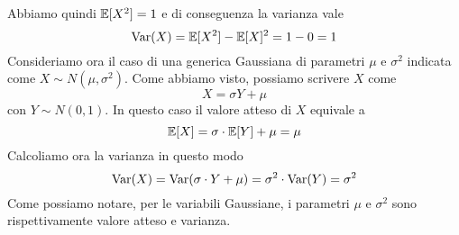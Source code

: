 Abbiamo quindi $\mathbb{E}[X^2] = 1$ e di conseguenza la varianza vale
\[ \operatorname{Var}(X) = \mathbb{E}[X^2] - \mathbb{E}[X]^2 = 1 - 0 = 1 \]
Consideriamo ora il caso di una generica Gaussiana di parametri $\mu$ e $\sigma^2$ indicata come
$X \sim N(\mu, \sigma^2)$. Come abbiamo visto, possiamo scrivere $X$ come
\[ X = \sigma Y + \mu \]
con $Y \sim N(0,1)$. In questo caso il valore atteso di $X$ equivale a
\[ \mathbb{E}[X] = \sigma \cdot \mathbb{E}[Y] + \mu = \mu \]
Calcoliamo ora la varianza in questo modo
\[ \operatorname{Var}(X) = \operatorname{Var}(\sigma \cdot Y + \mu) = \sigma^2 \cdot \operatorname{Var}(Y) = \sigma^2 \]
Come possiamo notare, per le variabili Gaussiane, i parametri $\mu$ e $\sigma^2$ sono
rispettivamente valore atteso e varianza.